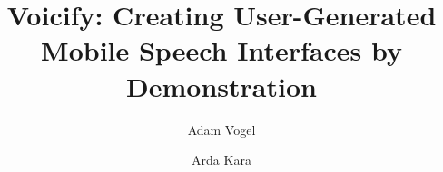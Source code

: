\documentclass[letterpaper]{article}
\begin{document}




\title{Voicify: Creating User-Generated Mobile Speech Interfaces by Demonstration}

\author{Adam Vogel \and Arda Kara}



\maketitle
\end{document}
